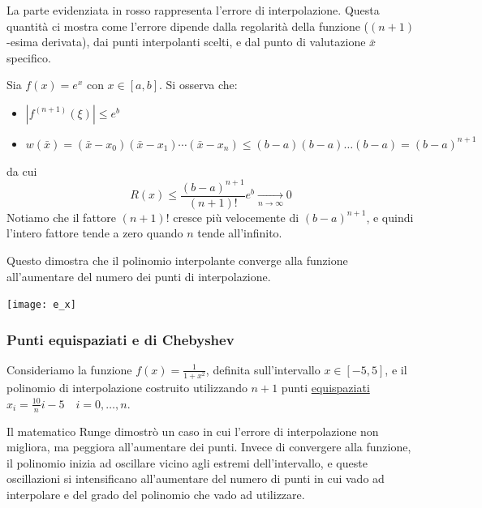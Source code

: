 \documentclass{article}
\begin{document}
La parte evidenziata in {\color{red}rosso} rappresenta l'errore di interpolazione. Questa
quantità ci mostra come l'errore dipende dalla regolarità della funzione
($(n+1)$-esima derivata), dai punti interpolanti scelti, e dal punto di
valutazione $\bar{x}$ specifico.
\begin{example}
    Sia $f(x)=e^x$ con $x\in[a,b]$. Si osserva che:
    \begin{itemize}
        \item $\left\lvert f^{(n+1)}(\xi)\right\rvert\leq e^b$
        \item $w(\bar{x})=(\bar{x}-x_0)(\bar{x}-x_1)\cdots(\bar{x}-x_n)\leq(b-a)(b-a)\ldots(b-a)=(b-a)^{n+1}$
    \end{itemize}
    da cui 
    $$R(x)\leq
    \frac{(b-a)^{n+1}}{(n+1)!}e^{b}\underset{n\rightarrow\infty}{\to}0$$
    Notiamo che il fattore $(n+1)!$ cresce più velocemente di $(b-a)^{n+1}$, e
    quindi l'intero fattore tende a zero quando $n$ tende all'infinito.

    Questo dimostra che il polinomio interpolante converge alla funzione
    all'aumentare del numero dei punti di interpolazione.
    \begin{center}
        \texttt{[image: e\_x]}
    \end{center}

\end{example}
\subsubsection{Punti equispaziati e di Chebyshev} Consideriamo la funzione
$f(x)=\frac{1}{1+x^2}$, definita sull'intervallo $x\in[-5,5]$, 
e il polinomio di interpolazione costruito utilizzando $n+1$ punti
\underline{equispaziati} $x_i=\frac{10}{n}i-5\quad i=0,\ldots,n$. 

Il matematico Runge dimostrò un caso in cui l'errore di interpolazione non
migliora, ma peggiora all'aumentare dei punti. Invece di convergere alla
funzione, il polinomio inizia ad oscillare vicino agli estremi
dell'intervallo, e queste oscillazioni si intensificano all'aumentare del numero di
punti in cui vado ad interpolare e del grado del polinomio che vado ad
utilizzare.
\end{document}
